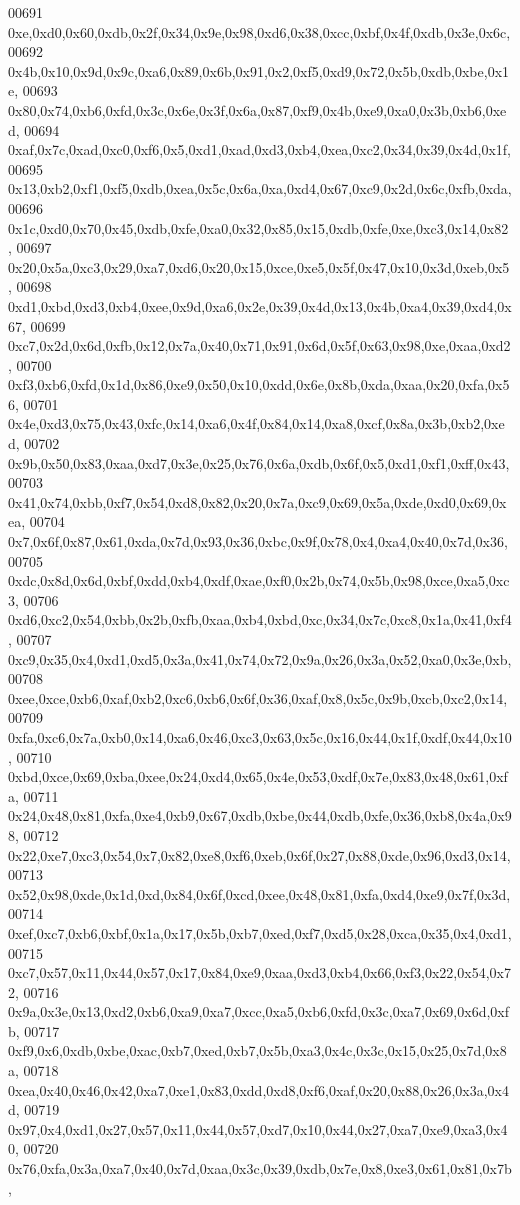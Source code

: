 \begin{DoxyCode}
00691   0xe,0xd0,0x60,0xdb,0x2f,0x34,0x9e,0x98,0xd6,0x38,0xcc,0xbf,0x4f,0xdb,0x3e,0x6c,
00692   0x4b,0x10,0x9d,0x9c,0xa6,0x89,0x6b,0x91,0x2,0xf5,0xd9,0x72,0x5b,0xdb,0xbe,0x1e,
00693   0x80,0x74,0xb6,0xfd,0x3c,0x6e,0x3f,0x6a,0x87,0xf9,0x4b,0xe9,0xa0,0x3b,0xb6,0xed,
00694   0xaf,0x7c,0xad,0xc0,0xf6,0x5,0xd1,0xad,0xd3,0xb4,0xea,0xc2,0x34,0x39,0x4d,0x1f,
00695   0x13,0xb2,0xf1,0xf5,0xdb,0xea,0x5c,0x6a,0xa,0xd4,0x67,0xc9,0x2d,0x6c,0xfb,0xda,
00696   0x1c,0xd0,0x70,0x45,0xdb,0xfe,0xa0,0x32,0x85,0x15,0xdb,0xfe,0xe,0xc3,0x14,0x82,
00697   0x20,0x5a,0xc3,0x29,0xa7,0xd6,0x20,0x15,0xce,0xe5,0x5f,0x47,0x10,0x3d,0xeb,0x5,
00698   0xd1,0xbd,0xd3,0xb4,0xee,0x9d,0xa6,0x2e,0x39,0x4d,0x13,0x4b,0xa4,0x39,0xd4,0x67,
00699   0xc7,0x2d,0x6d,0xfb,0x12,0x7a,0x40,0x71,0x91,0x6d,0x5f,0x63,0x98,0xe,0xaa,0xd2,
00700   0xf3,0xb6,0xfd,0x1d,0x86,0xe9,0x50,0x10,0xdd,0x6e,0x8b,0xda,0xaa,0x20,0xfa,0x56,
00701   0x4e,0xd3,0x75,0x43,0xfc,0x14,0xa6,0x4f,0x84,0x14,0xa8,0xcf,0x8a,0x3b,0xb2,0xed,
00702   0x9b,0x50,0x83,0xaa,0xd7,0x3e,0x25,0x76,0x6a,0xdb,0x6f,0x5,0xd1,0xf1,0xff,0x43,
00703   0x41,0x74,0xbb,0xf7,0x54,0xd8,0x82,0x20,0x7a,0xc9,0x69,0x5a,0xde,0xd0,0x69,0xea,
00704   0x7,0x6f,0x87,0x61,0xda,0x7d,0x93,0x36,0xbc,0x9f,0x78,0x4,0xa4,0x40,0x7d,0x36,
00705   0xdc,0x8d,0x6d,0xbf,0xdd,0xb4,0xdf,0xae,0xf0,0x2b,0x74,0x5b,0x98,0xce,0xa5,0xc3,
00706   0xd6,0xc2,0x54,0xbb,0x2b,0xfb,0xaa,0xb4,0xbd,0xc,0x34,0x7c,0xc8,0x1a,0x41,0xf4,
00707   0xc9,0x35,0x4,0xd1,0xd5,0x3a,0x41,0x74,0x72,0x9a,0x26,0x3a,0x52,0xa0,0x3e,0xb,
00708   0xee,0xce,0xb6,0xaf,0xb2,0xc6,0xb6,0x6f,0x36,0xaf,0x8,0x5c,0x9b,0xcb,0xc2,0x14,
00709   0xfa,0xc6,0x7a,0xb0,0x14,0xa6,0x46,0xc3,0x63,0x5c,0x16,0x44,0x1f,0xdf,0x44,0x10,
00710   0xbd,0xce,0x69,0xba,0xee,0x24,0xd4,0x65,0x4e,0x53,0xdf,0x7e,0x83,0x48,0x61,0xfa,
00711   0x24,0x48,0x81,0xfa,0xe4,0xb9,0x67,0xdb,0xbe,0x44,0xdb,0xfe,0x36,0xb8,0x4a,0x98,
00712   0x22,0xe7,0xc3,0x54,0x7,0x82,0xe8,0xf6,0xeb,0x6f,0x27,0x88,0xde,0x96,0xd3,0x14,
00713   0x52,0x98,0xde,0x1d,0xd,0x84,0x6f,0xcd,0xee,0x48,0x81,0xfa,0xd4,0xe9,0x7f,0x3d,
00714   0xef,0xc7,0xb6,0xbf,0x1a,0x17,0x5b,0xb7,0xed,0xf7,0xd5,0x28,0xca,0x35,0x4,0xd1,
00715   0xc7,0x57,0x11,0x44,0x57,0x17,0x84,0xe9,0xaa,0xd3,0xb4,0x66,0xf3,0x22,0x54,0x72,
00716   0x9a,0x3e,0x13,0xd2,0xb6,0xa9,0xa7,0xcc,0xa5,0xb6,0xfd,0x3c,0xa7,0x69,0x6d,0xfb,
00717   0xf9,0x6,0xdb,0xbe,0xac,0xb7,0xed,0xb7,0x5b,0xa3,0x4c,0x3c,0x15,0x25,0x7d,0x8a,
00718   0xea,0x40,0x46,0x42,0xa7,0xe1,0x83,0xdd,0xd8,0xf6,0xaf,0x20,0x88,0x26,0x3a,0x4d,
00719   0x97,0x4,0xd1,0x27,0x57,0x11,0x44,0x57,0xd7,0x10,0x44,0x27,0xa7,0xe9,0xa3,0x40,
00720   0x76,0xfa,0x3a,0xa7,0x40,0x7d,0xaa,0x3c,0x39,0xdb,0x7e,0x8,0xe3,0x61,0x81,0x7b,

\end{DoxyCode}
